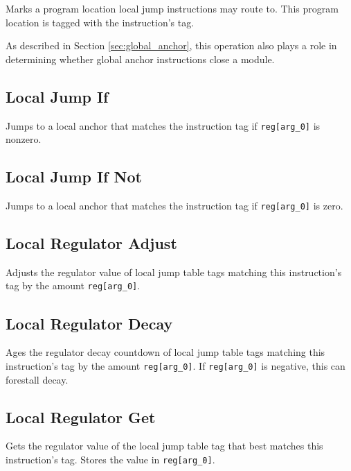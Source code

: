 
Marks a program location local jump instructions may route to.
This program location is tagged with the instruction's tag.

As described in Section \ref{sec:global_anchor}, this operation also plays a role in determining whether global anchor instructions close a module.

\subsection{Local Jump If}


Jumps to a local anchor that matches the instruction tag if \texttt{reg[arg\_0]} is nonzero.

\subsection{Local Jump If Not}


Jumps to a local anchor that matches the instruction tag if \texttt{reg[arg\_0]} is zero.

\subsection{Local Regulator Adjust}


Adjusts the regulator value of local jump table tags matching this instruction's tag by the amount \texttt{reg[arg\_0]}.

\subsection{Local Regulator Decay}


Ages the regulator decay countdown of local jump table tags matching this instruction's tag by the amount \texttt{reg[arg\_0]}.
If \texttt{reg[arg\_0]} is negative, this can forestall decay.

\subsection{Local Regulator Get}


Gets the regulator value of the local jump table tag that best matches this instruction's tag.
Stores the value in \texttt{reg[arg\_0]}.

